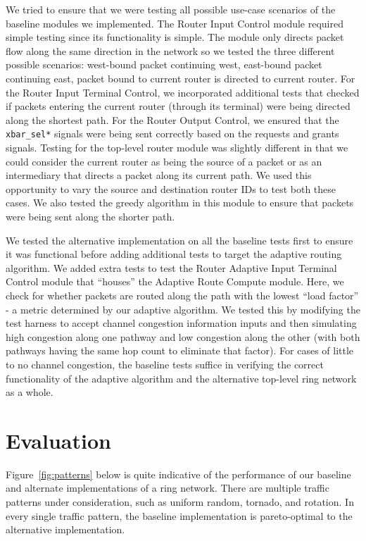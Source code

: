 \documentclass[10pt]{article}
\begin{document}
We tried to ensure that we were testing all possible use-case scenarios of the baseline
modules we implemented. The Router Input Control module required simple testing since its
functionality is simple. The module only directs packet flow along the same 
direction in the network so we tested the three different possible scenarios: west-bound packet
continuing west, east-bound packet continuing east, packet bound to current router is 
directed to current router. For the Router Input Terminal Control, we incorporated 
additional tests that checked if packets entering the current router (through its 
terminal) were being directed along the shortest path. For the Router Output Control, 
we ensured that the \texttt{xbar\_sel*} signals were being sent correctly based on the 
requests and grants signals. Testing for the top-level router module was slightly different
in that we could consider the current router as being the source of a packet or as an
intermediary that directs a packet along its current path. We used this opportunity to vary
the source and destination router IDs to test both these cases. We also tested the greedy
algorithm in this module to ensure that packets were being sent along the shorter path. \par

We tested the alternative implementation on all the baseline tests first to ensure it was
functional before adding additional tests to target the adaptive routing algorithm. We
added extra tests to test the Router Adaptive Input Terminal Control module that ``houses''
the Adaptive Route Compute module. Here, we check for whether packets are routed along the
path with the lowest ``load factor'' - a metric determined by our adaptive algorithm. We 
tested this by modifying the test harness to accept channel congestion information inputs and 
then simulating high congestion along one pathway and low congestion along the other (with 
both pathways having the same hop count to eliminate that factor). For cases of little to no 
channel congestion, the baseline tests suffice in verifying the correct functionality of the 
adaptive algorithm and the alternative top-level ring network as a whole.

\section{Evaluation}

Figure~\ref{fig:patterns} below is quite indicative of the performance of
our baseline and alternate implementations of a ring network.
There are multiple traffic patterns under consideration, such as uniform 
random, tornado, and rotation. 
In every single traffic pattern, the baseline implementation is pareto-optimal
to the alternative implementation. \par
\end{document}
